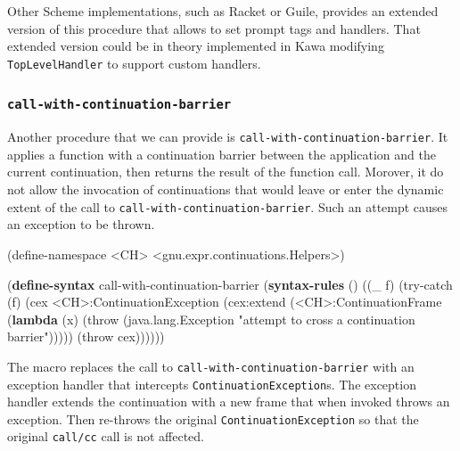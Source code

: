 \documentclass[12pt,a4paper,oneside,openright]{book}
\newenvironment{Shaded}{\begin{snugshade}}{\end{snugshade}}
\newcommand{\KeywordTok}[1]{\textcolor[rgb]{0.13,0.29,0.53}{\textbf{{#1}}}}
\newcommand{\StringTok}[1]{\textcolor[rgb]{0.31,0.60,0.02}{{#1}}}
\newcommand{\FunctionTok}[1]{\textcolor[rgb]{0.00,0.00,0.00}{{#1}}}
\newcommand{\NormalTok}[1]{{#1}}
\begin{document}
Other Scheme implementations, such as Racket or Guile, provides an
extended version of this procedure that allows to set prompt tags and
handlers. That extended version could be in theory implemented in Kawa
modifying \texttt{TopLevelHandler} to support custom handlers.

\subsubsection{\texorpdfstring{\texttt{call-with-continuation-barrier}}{call-with-continuation-barrier}}\label{call-with-continuation-barrier}

Another procedure that we can provide is
\texttt{call-with-continuation-barrier}. It applies a function with a
continuation barrier between the application and the current
continuation, then returns the result of the function call. Morover, it
do not allow the invocation of continuations that would leave or enter
the dynamic extent of the call to
\texttt{call-with-continuation-barrier}. Such an attempt causes an
exception to be thrown.

\begin{Shaded}
\begin{Highlighting}[]
    \NormalTok{(define-namespace <CH>}
       \NormalTok{<gnu.expr.continuations.Helpers>)}

    \NormalTok{(}\KeywordTok{define-syntax}\FunctionTok{ call-with-continuation-barrier}
      \NormalTok{(}\KeywordTok{syntax-rules} \NormalTok{()}
        \NormalTok{((_ f)}
         \NormalTok{(try-catch (f)}
           \NormalTok{(cex <CH>:ContinuationException}
             \NormalTok{(cex:extend (<CH>:ContinuationFrame}
                             \NormalTok{(}\KeywordTok{lambda} \NormalTok{(x)}
                               \NormalTok{(throw (java.lang.Exception}
                                        \StringTok{"attempt to cross a}
\StringTok{                                         continuation barrier"}\NormalTok{)))))}
             \NormalTok{(throw cex))))))}
\end{Highlighting}
\end{Shaded}

The macro replaces the call to \texttt{call-with-continuation-barrier}
with an exception handler that intercepts
\texttt{ContinuationException}s. The exception handler extends the
continuation with a new frame that when invoked throws an exception.
Then re-throws the original \texttt{ContinuationException} so that the
original \texttt{call/cc} call is not affected.
\end{document}
